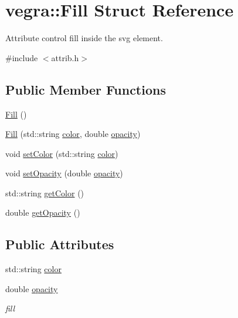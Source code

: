 \hypertarget{structvegra_1_1Fill}{}\section{vegra\+:\+:Fill Struct Reference}
\label{structvegra_1_1Fill}


Attribute control fill inside the svg element.  




{\ttfamily \#include $<$attrib.\+h$>$}

\subsection*{Public Member Functions}
\begin{DoxyCompactItemize}
\item 
\mbox{\hyperlink{structvegra_1_1Fill_aa305a257a120bc2f164853ff5b4f8372}{Fill}} ()
\item 
\mbox{\hyperlink{structvegra_1_1Fill_abcf0ef6c4fcf15ba55f3c3ec576dc550}{Fill}} (std\+::string \mbox{\hyperlink{structvegra_1_1Fill_a04e027e6c024853598f4f1f9750a18f5}{color}}, double \mbox{\hyperlink{structvegra_1_1Fill_a19afcc63bea86ccbb0eb425ca8ba3648}{opacity}})
\item 
void \mbox{\hyperlink{structvegra_1_1Fill_ab05e35510d4dfec3455cb537ab5bc227}{set\+Color}} (std\+::string \mbox{\hyperlink{structvegra_1_1Fill_a04e027e6c024853598f4f1f9750a18f5}{color}})
\item 
void \mbox{\hyperlink{structvegra_1_1Fill_a4968a0a2cb88537a0ea6aaf6bf095ad5}{set\+Opacity}} (double \mbox{\hyperlink{structvegra_1_1Fill_a19afcc63bea86ccbb0eb425ca8ba3648}{opacity}})
\item 
std\+::string \mbox{\hyperlink{structvegra_1_1Fill_a2dddee85ed5bf8e6455af59e69ef0dc8}{get\+Color}} ()
\item 
double \mbox{\hyperlink{structvegra_1_1Fill_a53203023282b847dec9aa3bf55507cde}{get\+Opacity}} ()
\end{DoxyCompactItemize}
\subsection*{Public Attributes}
\begin{DoxyCompactItemize}
\item 
std\+::string \mbox{\hyperlink{structvegra_1_1Fill_a04e027e6c024853598f4f1f9750a18f5}{color}}
\item 
double \mbox{\hyperlink{structvegra_1_1Fill_a19afcc63bea86ccbb0eb425ca8ba3648}{opacity}}
\begin{DoxyCompactList}\small\item\em fill \end{DoxyCompactList}\end{DoxyCompactItemize}


